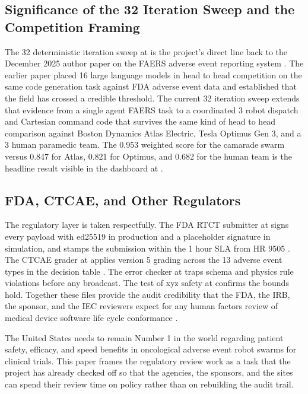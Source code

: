 \begin{sectionaccent}
\subsection{Significance of the 32 Iteration Sweep and the Competition Framing}
\label{sec:discussion-sweep}

The 32 deterministic iteration sweep at
 is the project's
direct line back to the December 2025 author paper on the FAERS
adverse event reporting system \cite{kawchak_2025_18029100}. The
earlier paper placed 16 large language models in head to head
competition on the same code generation task against FDA adverse
event data and established that the field has crossed a credible
threshold. The current 32 iteration sweep extends that evidence
from a single agent FAERS task to a coordinated 3 robot dispatch
and Cartesian command code that survives the same kind of head to
head comparison against Boston Dynamics Atlas Electric, Tesla
Optimus Gen 3, and a 3 human paramedic team. The 0.953 weighted
score for the camarade swarm versus 0.847 for Atlas, 0.821 for
Optimus, and 0.682 for the human team is the headline result
visible in the dashboard at
.

\subsection{FDA, CTCAE, and Other Regulators}
\label{sec:discussion-regulators}

The regulatory layer is taken respectfully. The FDA RTCT submitter at
 signs every payload
with ed25519 in production and a placeholder signature in simulation,
and stamps the submission within the 1 hour SLA from HR 9505
\cite{fda_rtct_2026, fda2026realtime}. The CTCAE grader at
 applies version 5 grading
across the 13 adverse event types in the decision table
\cite{ctcae_v5_2017}. The error checker at
 traps schema and physics rule
violations before any broadcast. The test of xyz safety at
 confirms the bounds
hold. Together these files provide the audit credibility that the
FDA, the IRB, the sponsor, and the IEC reviewers expect for any
human factors review of medical device software life cycle
conformance \cite{iec_62304, ich_e6r3_2025}.

The United States needs to remain Number 1 in the world regarding
patient safety, efficacy, and speed benefits in oncological adverse
event robot swarms for clinical trials. This paper frames the
regulatory review work as a task that the project has already
checked off so that the agencies, the sponsors, and the sites can
spend their review time on policy rather than on rebuilding the
audit trail.


\end{sectionaccent}
